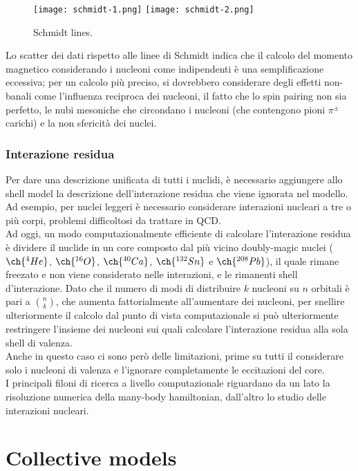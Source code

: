 \begin{figure}[!t]
	\texttt{[image: schmidt-1.png]}
	\texttt{[image: schmidt-2.png]}
	\caption{Schmidt lines.}
	\label{schmidt}
\end{figure}

Lo scatter dei dati rispetto alle linee di Schmidt indica che il calcolo del momento magnetico considerando i nucleoni come indipendenti è una semplificazione eccessiva; per un calcolo più preciso, si dovrebbero considerare degli effetti non-banali come l'influenza reciproca dei nucleoni, il fatto che lo spin pairing non sia perfetto, le nubi mesoniche che circondano i nucleoni (che contengono pioni $ \pi^{\pm} $ carichi) e la non sfericità dei nuclei.

\subsubsection{Interazione residua}

Per dare una descrizione unificata di tutti i nuclidi, è necessario aggiungere allo shell model la descrizione dell'interazione residua che viene ignorata nel modello. Ad esempio, per nuclei leggeri è necessario considerare interazioni nucleari a tre o più corpi, problemi difficoltosi da trattare in QCD.\\
Ad oggi, un modo computazionalmente efficiente di calcolare l'interazione residua è dividere il nuclide in un core composto dal più vicino doubly-magic nuclei ($ \ch{^4He} $, $ \ch{^{16}O} $, $ \ch{^{40}Ca} $, $ \ch{^{132}Sn} $ e $ \ch{^{208}Pb} $), il quale rimane freezato e non viene considerato nelle interazioni, e le rimanenti shell d'interazione. Dato che il numero di modi di distribuire $ k $ nucleoni su $ n $ orbitali è pari a $ \binom{n}{k} $, che aumenta fattorialmente all'aumentare dei nucleoni, per snellire ulteriormente il calcolo dal punto di vista computazionale si può ulteriormente restringere l'insieme dei nucleoni sui quali calcolare l'interazione residua alla sola shell di valenza.\\
Anche in questo caso ci sono però delle limitazioni, prime su tutti il considerare solo i nucleoni di valenza e l'ignorare completamente le eccitazioni del core.\\
I principali filoni di ricerca a livello computazionale riguardano da un lato la risoluzione numerica della many-body hamiltonian, dall'altro lo studio delle interazioni nucleari.

\section{Collective models}


